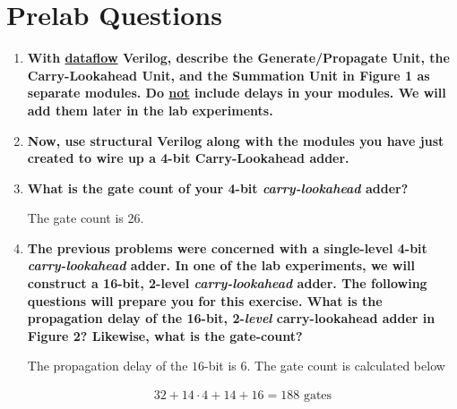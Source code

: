 \documentclass[a4paper,12pt]{article}
\begin{document}
\section*{Prelab Questions}

% 

\begin{enumerate}
  \item \textbf{With \underline{dataflow} Verilog, describe the Generate/Propagate Unit, the Carry-Lookahead Unit, and the Summation Unit in Figure 1 as separate modules. 
  Do \underline{not} include delays in your modules. We will add them later in the lab experiments.}
  
    
    
    
    
    

  \item \textbf{Now, use structural Verilog along with the modules you have just created to wire up a 4-bit Carry-Lookahead adder.}
  
  


  
  \item \textbf{What is the gate count of your 4-bit \textit{carry-lookahead} adder?}
  
  The gate count is 26.
  
  \item \textbf{The previous problems were concerned with a single-level 4-bit \textit{carry-lookahead} adder. In one of the lab experiments, we will construct a 16-bit, 2-level \textit{carry-lookahead} adder. The following questions will prepare you for this exercise. What is the propagation delay of the 16-bit, 2-\textit{level} carry-lookahead adder in Figure 2? Likewise, what is the gate-count?}

  The propagation delay of the $16$-bit is $6$. The gate count is calculated below
  \vspace{-30pt}
  \begin{center}
    \begin{align*}
      32 + 14\cdot4 + 14 + 16 = 188 \text{ gates}
    \end{align*}
  \end{center}
\end{enumerate}
\end{document}
